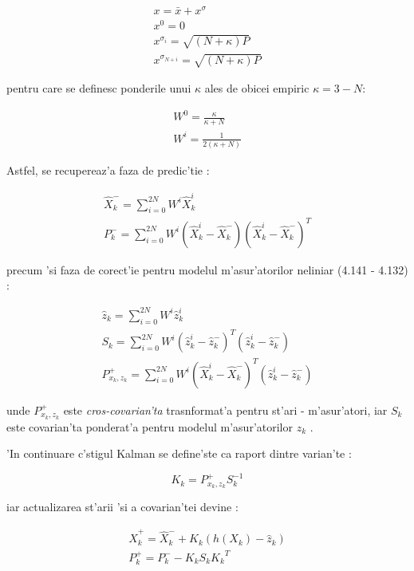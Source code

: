 \documentclass[12pt,a4paper,twoside]{report}
\begin{document}
\begin{gather}
    x = \bar x + x^{\sigma} \\
    x^0 = 0 \\
    x^{\sigma_i} = \sqrt{(N+\kappa) P} \\ 
    x^{\sigma_{N+i}} = \sqrt{(N+\kappa) P}
\end{gather}

pentru care se definesc ponderile unui $\kappa$ ales de obicei empiric  $\kappa = 3 - N$\cite{882463}:

\begin{gather}
    W^0 = \frac{\kappa}{\kappa + N} \\
    W^i = \frac{1}{2(\kappa + N)}
\end{gather}


Astfel, se recupereaz'a faza de predic'tie \cite{882463} \cite{1271397}:

\begin{gather}
\hat X^-_{k} = \sum_{i=0}^{2N} W^i \hat X^i_{k} \\
P^-_{k} = \sum_{i=0}^{2N} W^i (\hat X^i_{k} - \hat X^-_{k} )(\hat X^i_{k} - \hat X^-_{k})^T 
\end{gather}

precum 'si faza de corect'ie pentru modelul m'asur'atorilor neliniar (4.141 - 4.132) \cite{882463}:

\begin{gather}
\hat z_{k} = \sum_{i=0}^{2N} W^i \hat z^i_{k} \\
S_{k} = \sum_{i=0}^{2N} W^i (\hat z^i_{k} - \hat z^-_{k} )^T(\hat z^i_{k} - \hat z^-_{k}) \\  
P^+_{x_k,z_k} = \sum_{i=0}^{2N} W^i (\hat X^i_{k} - \hat X^-_{k} )^T(\hat z^i_{k} - \hat z^-_{k})
\end{gather}


unde $P^+_{x_k,z_k}$ este \textit{cros-covarian'ta} trasnformat'a pentru st'ari - m'asur'atori, iar  $S_{k}$ este covarian'ta ponderat'a pentru modelul m'asur'atorilor $z_{k}$ \cite{1271397}.

'In continuare c\ia 'stigul Kalman se define'ste ca raport dintre varian'te \cite{882463}:

\begin{equation}
    K_k = P^+_{x_k,z_k} S_{k}^{-1}
\end{equation}

iar actualizarea st'arii 'si a covarian'tei devine \cite{882463}: 

\begin{gather}
\hat X^+_{k} = \hat X^-_{k} + K_k( h(X_k) - \hat z_{k}) \\
P^+_{k} = P^-_{k} - K_k S_k {K_k}^T
\end{gather}
\end{document}

